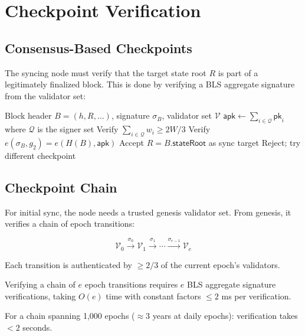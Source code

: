 \section{Checkpoint Verification}
\label{sec:checkpoint}

\subsection{Consensus-Based Checkpoints}

The syncing node must verify that the target state root $R$ is part of a legitimately finalized block. This is done by verifying a BLS aggregate signature from the validator set:

\begin{algorithm}[H]
\caption{Checkpoint Verification}
\label{alg:checkpoint}
\begin{algorithmic}[1]
\Require Block header $B = (h, R, \ldots)$, signature $\sigma_B$, validator set $\mathcal{V}$
\State $\mathsf{apk} \gets \sum_{i \in \mathcal{Q}} \mathsf{pk}_i$ where $\mathcal{Q}$ is the signer set
\State Verify $\sum_{i \in \mathcal{Q}} w_i \geq 2W/3$
\State Verify $e(\sigma_B, g_2) = e(H(B), \mathsf{apk})$
    \State Accept $R = B.\mathsf{stateRoot}$ as sync target
\Else
    \State Reject; try different checkpoint
\EndIf
\end{algorithmic}
\end{algorithm}

\subsection{Checkpoint Chain}

For initial sync, the node needs a trusted genesis validator set. From genesis, it verifies a chain of epoch transitions:

\begin{equation}
    \mathcal{V}_0 \xrightarrow{\sigma_0} \mathcal{V}_1 \xrightarrow{\sigma_1} \cdots \xrightarrow{\sigma_{e-1}} \mathcal{V}_e
\end{equation}

Each transition is authenticated by $\geq 2/3$ of the current epoch's validators.

\begin{proposition}
Verifying a chain of $e$ epoch transitions requires $e$ BLS aggregate signature verifications, taking $O(e)$ time with constant factors $\leq 2$ ms per verification.
\end{proposition}

For a chain spanning 1,000 epochs ($\approx 3$ years at daily epochs): verification takes $< 2$ seconds.

